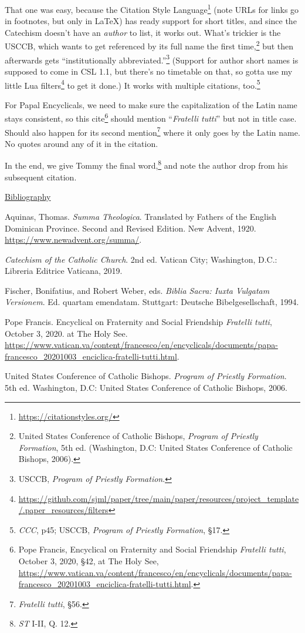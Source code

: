 \documentclass[
    12pt,
    letterpaper,
    oneside,
    noraggedright
]{turabian-researchpaper}
\DeclareRobustCommand{\href}[2]{#2\footnote{\url{#1}}}
\newlength{\cslhangindent}
\newlength{\cslitemsep} %
\newenvironment{CSLReferences}[2]
 {
\newpage %
\singlespacing %
\centerline{\underline{Bibliography}} %
\begin{list}{}{%
  \setlength{\itemindent}{0pt}
  \setlength{\leftmargin}{0pt}
  \setlength{\parsep}{0pt}
  \setlength{\leftmargin}{\cslhangindent}
  \setlength{\itemindent}{-1\cslhangindent}
  \setlength{\itemsep}{\cslitemsep}}} %
 {\end{list}}
\begin{document}
That one was easy, because the
\href{https://citationstyles.org/}{Citation Style Language} (note URLs
for links go in footnotes, but only in LaTeX) has ready support for
short titles, and since the Catechism doesn't have an \emph{author} to
list, it works out. What's trickier is the USCCB, which wants to get
referenced by its full name the first time,\footnote{United States
  Conference of Catholic Bishops, \emph{Program of Priestly Formation},
  5th ed. (Washington, D.C: United States Conference of Catholic
  Bishops, 2006).} but then afterwards gets ``institutionally
abbreviated.''\footnote{USCCB, \emph{Program of Priestly Formation}.}
(Support for author short names is supposed to come in CSL 1.1, but
there's no timetable on that, so gotta use
\href{https://github.com/sjml/paper/tree/main/paper/resources/project_template/.paper_resources/filters}{my
little Lua filters} to get it done.) It works with multiple citations,
too.\footnote{\emph{CCC}, p45; USCCB, \emph{Program of Priestly
  Formation}, §17.}

For Papal Encyclicals, we need to make sure the capitalization of the
Latin name stays consistent, so this cite\footnote{Pope Francis,
  {Encyclical on Fraternity and Social Friendship \emph{Fratelli
  tutti},} October 3, 2020, §42, at The Holy See,
  \url{https://www.vatican.va/content/francesco/en/encyclicals/documents/papa-francesco_20201003_enciclica-fratelli-tutti.html}.}
should mention ``\emph{Fratelli tutti}'' but not in title case. Should
also happen for its second mention\footnote{{\emph{Fratelli tutti},}
  §56.} where it only goes by the Latin name. No quotes around any of it
in the citation.

In the end, we give Tommy the final word,\footnote{\emph{ST} I-II, Q.
  12.} and note the author drop from his subsequent citation.

\label{refs}
\begin{CSLReferences}{1}{0}
Aquinas, Thomas. \emph{Summa Theologica}. Translated by Fathers of the
English Dominican Province. Second and Revised Edition. New Advent,
1920. \url{https://www.newadvent.org/summa/}.

\emph{Catechism of the Catholic Church}. 2nd ed. Vatican City;
Washington, D.C.: Libreria Editrice Vaticana, 2019.

Fischer, Bonifatius, and Robert Weber, eds. \emph{Biblia Sacra: Iuxta
Vulgatam Versionem}. Ed. quartam emendatam. Stuttgart: Deutsche
Bibelgesellschaft, 1994.

Pope Francis. {Encyclical on Fraternity and Social Friendship
\emph{Fratelli tutti},} October 3, 2020. at The Holy See.
\url{https://www.vatican.va/content/francesco/en/encyclicals/documents/papa-francesco_20201003_enciclica-fratelli-tutti.html}.

United States Conference of Catholic Bishops. \emph{Program of Priestly
Formation}. 5th ed. Washington, D.C: United States Conference of
Catholic Bishops, 2006.

\end{CSLReferences}
\end{document}
